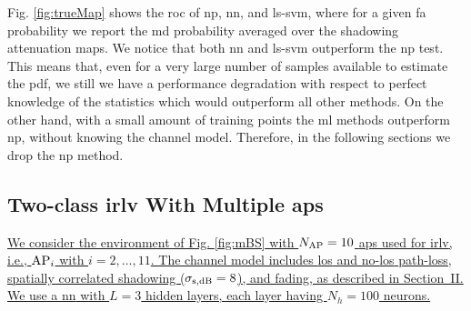 \documentclass[draftcls,onecolumn,12pt]{IEEEtran}
\newcommand{\ie}{i.e., }
\begin{document}
Fig. \ref{fig:trueMap} shows the \ac{roc}  of \ac{np}, \ac{nn}, and \ac{ls}-\ac{svm}, where for a given \ac{fa} probability we report the  \ac{md} probability averaged over the shadowing attenuation maps. We notice that both \ac{nn} and \ac{ls}-\ac{svm} outperform the \ac{np} test. This means that, even for a very large number of samples available to estimate the \ac{pdf}, we still we have a performance degradation with respect to perfect knowledge of the statistics which would outperform all other methods. On the other hand, with a small amount of training points the \ac{ml} methods outperform \ac{np}, without knowing the channel model. Therefore, in the following sections we drop the \ac{np} method.
 




\subsection{Two-class \ac{irlv} With Multiple \acp{ap}}
\label{sec:res_fading}

\uline{We consider the environment of Fig. \ref{fig:mBS} with $N_{\rm AP}=10$ \acp{ap} used for \ac{irlv}, \ie ${\rm AP}_i$ with $i = 2,\dots,11$. The channel model includes \ac{los} and no-\ac{los} path-loss, spatially correlated shadowing ($\sigma_{\rm s, dB} = 8$), and fading, as described in Section~II. We use a \ac{nn} with $L=3$ hidden layers, each layer having $N_h = 100$ neurons.}  
\end{document}

